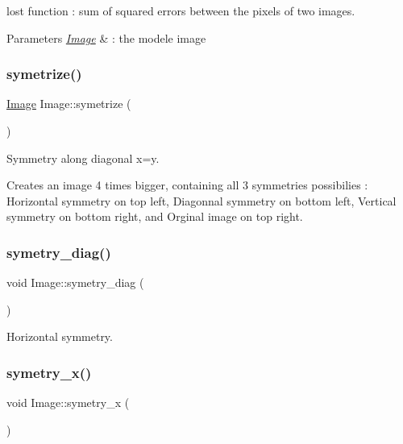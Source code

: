 lost function \+: sum of squared errors between the pixels of two images. 


\begin{DoxyParams}{Parameters}
{\em \hyperlink{class_image}{Image}} & \+: the modele image \\
\hline
\end{DoxyParams}
\mbox{\label{class_image_ae2457c01fba86c48ffd25a932e8a835a}} 
\subsubsection{\texorpdfstring{symetrize()}{symetrize()}}
{\footnotesize\ttfamily \hyperlink{class_image}{Image} Image\+::symetrize (\begin{DoxyParamCaption}{ }\end{DoxyParamCaption})}



Symmetry along diagonal x=y. 

Creates an image 4 times bigger, containing all 3 symmetries possibilies \+: Horizontal symmetry on top left, Diagonnal symmetry on bottom left, Vertical symmetry on bottom right, and Orginal image on top right. \mbox{\label{class_image_a2ce3ef5944ba2f2f150750306f51e700}} 
\subsubsection{\texorpdfstring{symetry\+\_\+diag()}{symetry\_diag()}}
{\footnotesize\ttfamily void Image\+::symetry\+\_\+diag (\begin{DoxyParamCaption}{ }\end{DoxyParamCaption})}



Horizontal symmetry. 

\mbox{\label{class_image_a1e5dc2ce667f652f79dfd424601746e6}} 
\subsubsection{\texorpdfstring{symetry\+\_\+x()}{symetry\_x()}}
{\footnotesize\ttfamily void Image\+::symetry\+\_\+x (\begin{DoxyParamCaption}{ }\end{DoxyParamCaption})}

